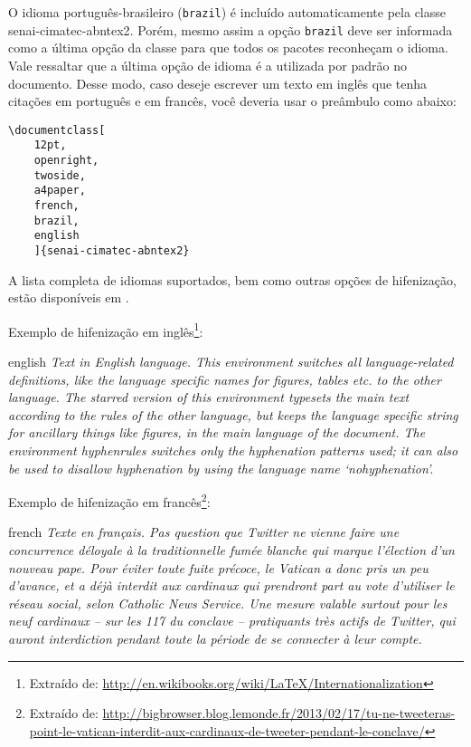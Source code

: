 O idioma português-brasileiro (\texttt{brazil}) é incluído automaticamente pela classe \textsf{senai-cimatec-abntex2}. Porém, mesmo assim a opção \texttt{brazil} deve ser informada como a última opção da classe para que todos os pacotes reconheçam o idioma. Vale ressaltar que a última opção de idioma é a utilizada por padrão no documento. Desse modo, caso deseje escrever um texto em inglês que tenha citações em português e em francês, você deveria usar o preâmbulo como abaixo:

\begin{verbatim}
\documentclass[
	12pt,
	openright,
	twoside,
	a4paper,
	french,
	brazil,
	english
	]{senai-cimatec-abntex2}
\end{verbatim}

A lista completa de idiomas suportados, bem como outras opções de hifenização,
estão disponíveis em .

Exemplo de hifenização em inglês\footnote{Extraído de:
  \url{http://en.wikibooks.org/wiki/LaTeX/Internationalization}}:

\begin{otherlanguage*}{english}
  \textit{Text in English language. This environment switches all language-related
    definitions, like the language specific names for figures, tables etc. to the other
    language. The starred version of this environment typesets the main text
    according to the rules of the other language, but keeps the language specific
    string for ancillary things like figures, in the main language of the document.
    The environment hyphenrules switches only the hyphenation patterns used; it can
    also be used to disallow hyphenation by using the language name
    `nohyphenation'.}
\end{otherlanguage*}

Exemplo de hifenização em francês\footnote{Extraído de:
  \url{http://bigbrowser.blog.lemonde.fr/2013/02/17/tu-ne-tweeteras-point-le-vatican-interdit-aux-cardinaux-de-tweeter-pendant-le-conclave/}}:

\begin{otherlanguage*}{french}
  \textit{Texte en français. Pas question que Twitter ne vienne faire une
    concurrence déloyale à la traditionnelle fumée blanche qui marque l'élection
    d'un nouveau pape. Pour éviter toute fuite précoce, le Vatican a donc pris un
    peu d'avance, et a déjà interdit aux cardinaux qui prendront part au vote
    d'utiliser le réseau social, selon Catholic News Service. Une mesure valable
    surtout pour les neuf cardinaux – sur les 117 du conclave – pratiquants très
    actifs de Twitter, qui auront interdiction pendant toute la période de se
    connecter à leur compte.}
\end{otherlanguage*}

